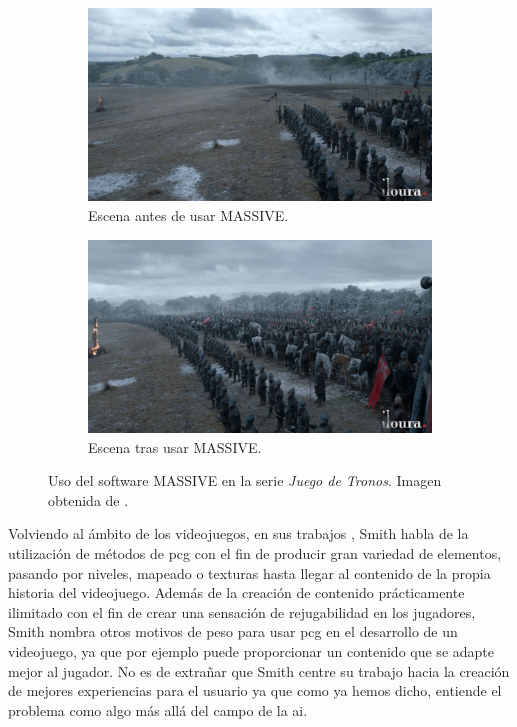 \begin{figure}[H]
    \begin{center}
        \begin{subfigure}[b]{0.49\textwidth}
            \includegraphics[width=\textwidth]{img/got_before.jpg}
            \caption{Escena antes de usar MASSIVE.}
        \end{subfigure}
        \hfill
        \begin{subfigure}[b]{0.49\textwidth}
            \includegraphics[width=\textwidth]{img/got_after.jpg}
            \caption{Escena tras usar MASSIVE.}
        \end{subfigure}
        \caption{Uso del software MASSIVE en la serie \textit{Juego de Tronos}. Imagen obtenida de \cite{massive}.}
        \label{fig:massive}
    \end{center}
\end{figure}

Volviendo al ámbito de los videojuegos, en sus trabajos \cite{smith2014}, \cite{smith2015} Smith habla de la utilización de métodos de \acrshort{pcg} con el fin de producir gran variedad de elementos, pasando por niveles, mapeado o texturas hasta llegar al contenido de la propia historia del videojuego. Además de la creación de contenido prácticamente ilimitado con el fin de crear una sensación de rejugabilidad en los jugadores, Smith nombra otros motivos de peso para usar \acrshort{pcg} en el desarrollo de un videojuego, ya que por ejemplo puede proporcionar un contenido que se adapte mejor al jugador. No es de extrañar que Smith centre su trabajo hacia la creación de mejores experiencias para el usuario ya que como ya hemos dicho, entiende el problema como algo más allá del campo de la \acrshort{ai}.

